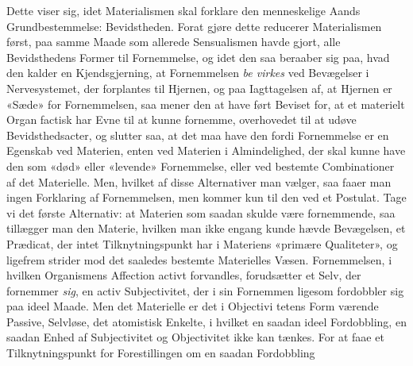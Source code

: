 \documentclass[12pt,a4paper]{book}
\begin{document}
Dette viser sig, idet Materialismen skal forklare den
menneskelige Aands Grundbestemmelse: Bevidstheden. Forat
gjøre dette reducerer Materialismen først, paa samme Maade
som allerede Sensualismen havde gjort, alle Bevidsthedens
Former til Fornemmelse, og idet den saa beraaber sig paa,
hvad den kalder en Kjendsgjerning, at Fornemmelsen \emph{be\-%
virkes} ved Bevægelser i Nervesystemet, der forplantes til
Hjernen, og paa Iagttagelsen af, at Hjernen er «Sæde» for
Fornemmelsen, saa mener den at have ført Beviset for, at et
materielt Organ factisk har Evne til at kunne fornemme,
overhovedet til at udøve Bevidsthedsacter, og slutter saa, at
det maa have den fordi Fornemmelse er en Egenskab ved
Materien, enten ved Materien i Almindelighed, der skal kunne
have den som «død» eller «levende» Fornemmelse, eller ved
bestemte Combinationer af det Materielle. Men, hvilket af
disse Alternativer man vælger, saa faaer man ingen Forklaring
af Fornemmelsen, men kommer kun til den ved et Postulat.
Tage vi det første Alternativ: at Materien som saadan skulde
være fornemmende, saa tillægger man den Materie, hvilken
man ikke engang kunde hævde Bevægelsen, et Prædicat, der
intet Tilknytningspunkt har i Materiens «primære Qualiteter»,
og ligefrem strider mod det saaledes bestemte Materielles
Væsen. Fornemmelsen, i hvilken Organismens Affection
activt forvandles, forudsætter et Selv, der fornemmer \emph{sig}, en
activ Subjectivitet, der i sin Fornemmen ligesom fordobbler
sig paa ideel Maade. Men det Materielle er det i Objectivi\-%
tetens Form værende Passive, Selvløse, det atomistisk Enkelte,
i hvilket en saadan ideel Fordobbling, en saadan Enhed af
Subjectivitet og Objectivitet ikke kan tænkes. For at faae et
Tilknytningspunkt for Forestillingen om en saadan Fordobbling
\end{document}
